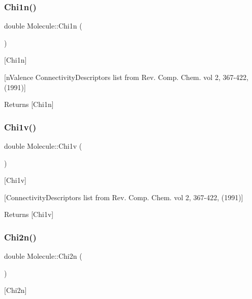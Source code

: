 \subsubsection{\texorpdfstring{Chi1n()}{Chi1n()}}
{\footnotesize\ttfamily double Molecule\+::\+Chi1n (\begin{DoxyParamCaption}{ }\end{DoxyParamCaption})}



\mbox{[}Chi1n\mbox{]} 

\mbox{[}n\+Valence Connectivity\+Descriptors list from Rev. Comp. Chem. vol 2, 367-\/422, (1991)\mbox{]}

\begin{DoxyReturn}{Returns}
\mbox{[}Chi1n\mbox{]} 
\end{DoxyReturn}
\mbox{\label{class_molecule_a867c7ad16812f1aafac38087eec756f4}} 
\subsubsection{\texorpdfstring{Chi1v()}{Chi1v()}}
{\footnotesize\ttfamily double Molecule\+::\+Chi1v (\begin{DoxyParamCaption}{ }\end{DoxyParamCaption})}



\mbox{[}Chi1v\mbox{]} 

\mbox{[}Connectivity\+Descriptors list from Rev. Comp. Chem. vol 2, 367-\/422, (1991)\mbox{]}

\begin{DoxyReturn}{Returns}
\mbox{[}Chi1v\mbox{]} 
\end{DoxyReturn}
\mbox{\label{class_molecule_a74a0866a08a22793a822d7411e2f3758}} 
\subsubsection{\texorpdfstring{Chi2n()}{Chi2n()}}
{\footnotesize\ttfamily double Molecule\+::\+Chi2n (\begin{DoxyParamCaption}{ }\end{DoxyParamCaption})}



\mbox{[}Chi2n\mbox{]} 

